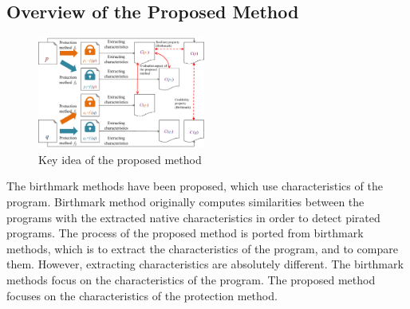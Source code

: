 \documentclass[conference]{IEEEtran}
\begin{document}
% 
% 

\subsection{Overview of the Proposed Method}

\begin{figure}[b]
  \centering
  \includegraphics[width=0.49\textwidth]{images/key_idea}
  \caption{Key idea of the proposed method}\label{fig:keyidea}
\end{figure}

The birthmark methods have been proposed, which use characteristics of
the program\cite{tamada04iasted,tamada05ieice}.  Birthmark method
originally computes similarities between the programs with the
extracted native characteristics in order to detect pirated programs.
%
The process of the proposed method is ported from birthmark methods,
which is to extract the characteristics of the program, and to compare
them.  However, extracting characteristics are absolutely different.
The birthmark methods focus on the characteristics of the program.
The proposed method focuses on the characteristics of the protection
method.
\end{document}
